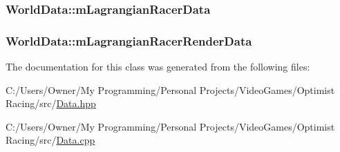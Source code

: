 \hypertarget{class_world_data_af67bbeb4b60eed38f04a58a79e4f1f26}{
\subsubsection[{m\-Lagrangian\-Racer\-Data}]{ World\-Data\-::m\-Lagrangian\-Racer\-Data}}\label{class_world_data_af67bbeb4b60eed38f04a58a79e4f1f26}
\hypertarget{class_world_data_ae5db22573828a345da184d14de38cf6e}{
\subsubsection[{m\-Lagrangian\-Racer\-Render\-Data}]{ World\-Data\-::m\-Lagrangian\-Racer\-Render\-Data}}\label{class_world_data_ae5db22573828a345da184d14de38cf6e}


The documentation for this class was generated from the following files\-:\begin{DoxyCompactItemize}
\item 
C\-:/\-Users/\-Owner/\-My Programming/\-Personal Projects/\-Video\-Games/\-Optimist Racing/src/\hyperlink{_data_8hpp}{Data.\-hpp}\item 
C\-:/\-Users/\-Owner/\-My Programming/\-Personal Projects/\-Video\-Games/\-Optimist Racing/src/\hyperlink{_data_8cpp}{Data.\-cpp}\end{DoxyCompactItemize}
